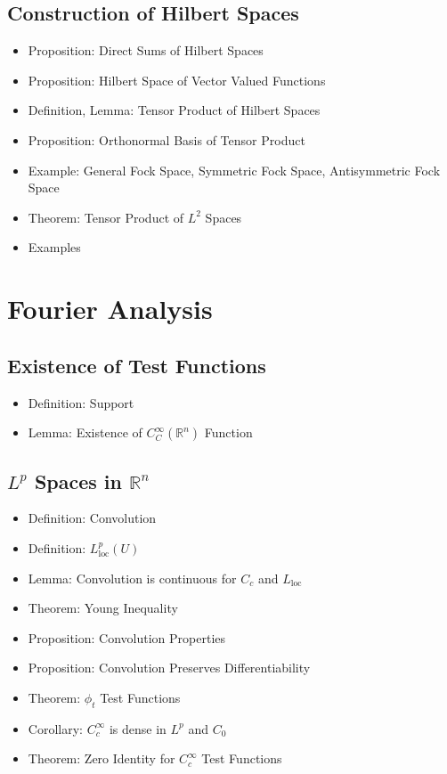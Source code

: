 \documentclass[8pt,twocolumn]{article}
\begin{document}
    \subsection{Construction of Hilbert Spaces} %
    \label{sub:construction_of_hilbert_spaces}
      \begin{itemize}
        \item Proposition: Direct Sums of Hilbert Spaces
        \item Proposition: Hilbert Space of Vector Valued Functions
        \item Definition, Lemma: Tensor Product of Hilbert Spaces
        \item Proposition: Orthonormal Basis of Tensor Product
        \item Example: General Fock Space, Symmetric Fock Space, Antisymmetric Fock Space
        \item Theorem: Tensor Product of $L^2$ Spaces
        \item Examples
      \end{itemize}

  \section{Fourier Analysis} %
  \label{sec:fourier_analysis}
    \subsection{Existence of Test Functions} %
    \label{sub:existence_of_test_functions}
      \begin{itemize}
        \item Definition: Support
        \item Lemma: Existence of $C_C^\infty(\mathds{R}^n)$ Function
      \end{itemize}

    \subsection{$L^p$ Spaces in $\mathds{R}^n$} %
      \begin{itemize}
        \item Definition: Convolution
        \item Definition: $L_\mathrm{loc}^p(U)$
        \item Lemma: Convolution is continuous for $C_c$ and $L_\mathrm{loc}$
        \item Theorem: Young Inequality
        \item Proposition: Convolution Properties
        \item Proposition: Convolution Preserves Differentiability
        \item Theorem: $\phi_t$ Test Functions
        \item Corollary: $C^\infty_c$ is dense in $L^p$ and $C_0$
        \item Theorem: Zero Identity for $C^\infty_c$ Test Functions
      \end{itemize}
\end{document}
